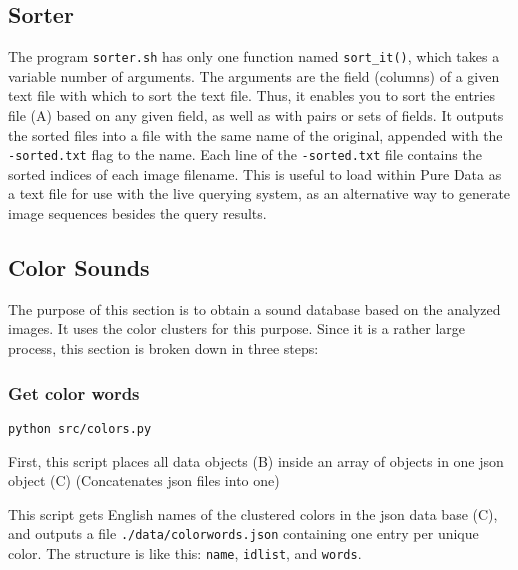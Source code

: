 \subsection{Sorter}

The program \texttt{sorter.sh} has only one function named \texttt{sort\_it()}, which takes a variable number of arguments. The arguments are the field (columns) of a given text file with which to sort the text file. Thus, it enables you to sort the entries file (A) based on any given field, as well as with pairs or sets of fields. It outputs the sorted files into a file with the same name of the original, appended with the \texttt{-sorted.txt} flag to the name. Each line of the \texttt{-sorted.txt} file contains the sorted indices of each image filename. This is useful to load within Pure Data as a text file for use with the live querying system, as an alternative way to generate image sequences besides the query results.



\subsection{Color Sounds}

The purpose of this section is to obtain a sound database based on the analyzed images. It uses the color clusters for this purpose. Since it is a rather large process, this section is broken down in three steps:


\subsubsection{Get color words}

\texttt{python\ src/colors.py}

First, this script places all data objects (B) inside an array of objects in one \gls{json} object (C) (Concatenates \gls{json} files into one)

This script gets English names of the clustered colors in the \gls{json} data base (C), and outputs a file \texttt{./data/colorwords.json} containing one entry per unique color. The structure is like this: \texttt{name}, \texttt{idlist}, and \texttt{words}.

